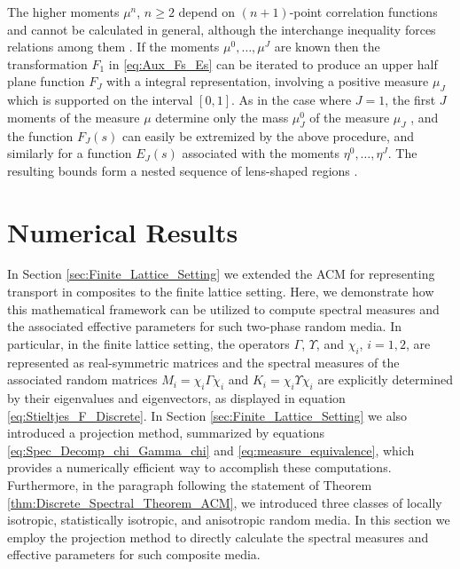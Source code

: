 \documentclass{cmslatex}
\begin{document}
The higher moments $\mu^n$, $n\geq2$ depend on $(n+1)$-point correlation
functions \cite{Golden:CMP-473} and cannot be calculated in general,
although the interchange inequality forces relations among them
\cite{Milton:JAP-5294}. If the moments $\mu^0,\ldots,\mu^J$ are known then the
transformation $F_1$ in \eqref{eq:Aux_Fs_Es} can be iterated to
produce an upper half plane function $F_J$ with a integral
representation, involving a positive measure $\mu_J$ which is supported
on the interval $[0,1]$. As in the case where $J=1$, the first $J$
moments of the measure $\mu$ determine only the mass $\mu_J^0$ of the
measure $\mu_J$ \cite{Golden:1986:BCP}, and the function $F_J(s)$ can
easily be extremized by the above procedure, and similarly for a
function $E_J(s)$ associated with the moments $\eta^0,\ldots,\eta^J$. The
resulting bounds form a nested sequence of lens-shaped regions
\cite{Golden:1986:BCP}.




\section{Numerical Results}\label{sec:Numerical_Results}
%
In Section \ref{sec:Finite_Lattice_Setting} we extended the ACM for
representing transport in composites to the finite lattice
setting. Here, we demonstrate how this mathematical 
framework can be utilized to compute spectral measures and the
associated effective parameters for such two-phase random media. In
particular, in the finite lattice setting, the operators $\Gamma$, $\Upsilon$, and 
$\chi_i$, $i=1,2$, are represented as real-symmetric matrices and the
spectral measures of the associated random matrices $M_i=\chi_i\Gamma\chi_i$ and 
$K_i=\chi_i\Upsilon\chi_i$ are explicitly determined by their eigenvalues and
eigenvectors, as displayed in equation
\eqref{eq:Stieltjes_F_Discrete}. In Section
\ref{sec:Finite_Lattice_Setting} we also introduced a projection method,
summarized by equations \eqref{eq:Spec_Decomp_chi_Gamma_chi} and
\eqref{eq:measure_equivalence}, which provides a numerically efficient
way to accomplish these computations. Furthermore, in the paragraph
following the statement of Theorem
\ref{thm:Discrete_Spectral_Theorem_ACM}, we introduced three 
classes of locally isotropic, statistically isotropic, and anisotropic
random media. In this section we employ the projection method to
directly calculate the spectral measures and effective parameters for
such composite media.
\end{document}
